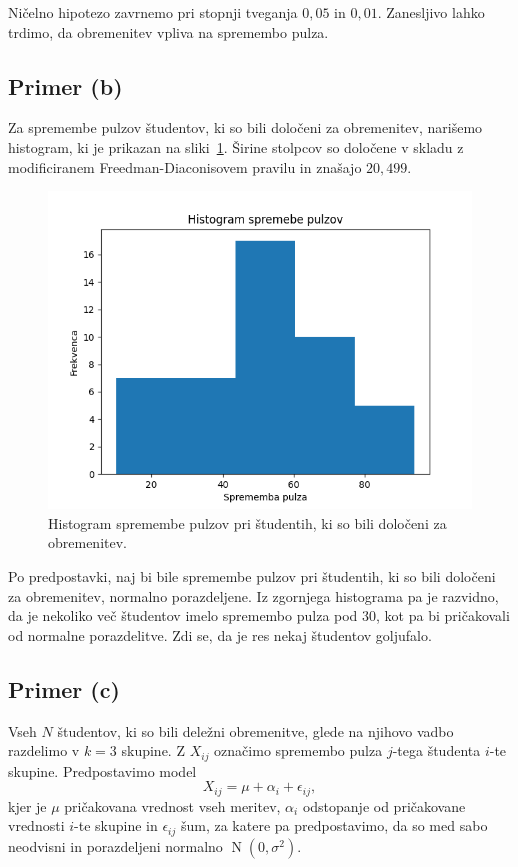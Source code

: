 \documentclass[a4paper,11pt]{article}
\DeclareMathOperator{\N}{N}
\begin{document}
Ničelno hipotezo zavrnemo pri stopnji tveganja $0{,}05$ in $0{,}01$.
Zanesljivo lahko trdimo, da obremenitev vpliva na spremembo pulza.

\subsection*{Primer (b)}

Za spremembe pulzov študentov, ki so bili določeni za obremenitev, narišemo histogram, ki je prikazan na sliki~\ref{histogram_studenti}.
Širine stolpcov so določene v skladu z modificiranem Freedman-Diaconisovem pravilu in znašajo $20{,}499$.

\begin{figure}[H]
    \centering
    \includegraphics[scale=0.7]{Histogram.png}
    \caption{Histogram spremembe pulzov pri študentih, ki so bili določeni za obremenitev.}
    \label{histogram_studenti}
\end{figure}

Po predpostavki, naj bi bile spremembe pulzov pri študentih, ki so bili določeni za obremenitev, normalno porazdeljene.
Iz zgornjega histograma pa je razvidno, da je nekoliko več študentov imelo spremembo pulza pod $30$, kot pa bi pričakovali od normalne porazdelitve.
Zdi se, da je res nekaj študentov goljufalo.

\subsection*{Primer (c)}

Vseh $N$ študentov, ki so bili deležni obremenitve, glede na njihovo vadbo razdelimo v $k=3$ skupine. 
Z $X_{ij}$ označimo spremembo pulza $j$-tega študenta $i$-te skupine.
Predpostavimo model 
\[X_{ij} = \mu + \alpha_i + \epsilon_{ij},\]
kjer je $\mu$ pričakovana vrednost vseh meritev, $\alpha_i$ odstopanje od pričakovane vrednosti $i$-te skupine in $\epsilon_{ij}$ šum, 
za katere pa predpostavimo, da so med sabo neodvisni in porazdeljeni normalno $\N(0, \sigma^2)$.
\end{document}
